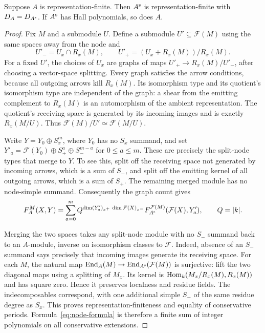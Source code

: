\begin{lemma}\label{lem:node-hall}
Suppose $A$ is representation-finite. Then $A^{\rm s}$ is representation-finite with $D_A=D_{A^{\rm s}}$. If $A^{\rm s}$ has Hall polynomials, so does $A$.
\end{lemma}
\begin{proof}
Fix $M$ and a submodule $U$. Define a submodule $U'\subseteq\mathcal F(M)$ using the same spaces away from the node and
\[
 U'_- =U_x\cap R_x(M),\qquad
 U'_+=(U_x+R_x(M))/R_x(M).
\]
For a fixed $U'$, the choices of $U_x$ are graphs of maps
$U'_+\to R_x(M)/U'_-$, after choosing a vector-space splitting. Every graph satisfies the arrow conditions, because all outgoing arrows kill $R_x(M)$. Its isomorphism type and its quotient's isomorphism type are independent of the graph: a shear from the emitting complement to $R_x(M)$ is an automorphism of the ambient representation. The quotient's receiving space is generated by its incoming images and is exactly $R_x(M/U)$. Thus $\mathcal F(M)/U'\simeq\mathcal F(M/U)$.

Write $Y=Y_0\oplus S_x^m$, where $Y_0$ has no $S_x$ summand, and set
$Y'_a=\mathcal F(Y_0)\oplus S_+^a\oplus S_-^{m-a}$ for $0\le a\le m$. These are precisely the split-node types that merge to $Y$. To see this, split off the receiving space not generated by incoming arrows, which is a sum of $S_-$, and split off the emitting kernel of all outgoing arrows, which is a sum of $S_+$. The remaining merged module has no node-simple summand. Consequently the graph count gives
\begin{equation}\label{eq:node-formula}
 F_A^M(X,Y)=\sum_{a=0}^m
 Q^{\dim(Y'_a)_{x^+}\,\dim\mathcal F(X)_{x^-}}
 F_{A^{\rm s}}^{\mathcal F(M)}(\mathcal F(X),Y'_a),
 \qquad Q=|k|.
\end{equation}

Merging the two spaces takes any split-node module with no $S_-$ summand back to an $A$-module, inverse on isomorphism classes to $\mathcal F$. Indeed, absence of an $S_-$ summand says precisely that incoming images generate its receiving space. For each $M$, the natural map
$\operatorname{End}_A(M)\to\operatorname{End}_{A^{\rm s}}(\mathcal F(M))$ is surjective: lift the two diagonal maps using a splitting of $M_x$. Its kernel is $\operatorname{Hom}_k(M_x/R_x(M),R_x(M))$ and has square zero. Hence it preserves localness and residue fields. The indecomposables correspond, with one additional simple $S_-$ of the same residue degree as $S_x$. This proves representation-finiteness and equality of conservative periods. Formula~\eqref{eq:node-formula} is therefore a finite sum of integer polynomials on all conservative extensions.
\end{proof}

